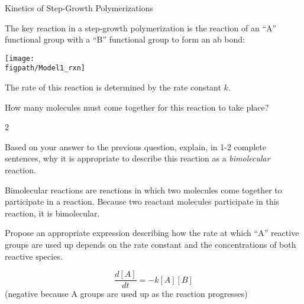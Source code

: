 \begin{activity}{Kinetics of Step-Growth Polymerizations}
\begin{instructornotes}
\end{instructornotes}


\begin{model}
\label{\labelbase:mdl:simple}

	The key reaction in a step-growth polymerization is the reaction of an ``A'' functional group with a ``B'' functional group to form an ab bond:
	
	\centerline{\texttt{[image: \\figpath/Model1\_rxn]}}
	
	The rate of this reaction is determined by the rate constant $k$.

\end{model}


\begin{ctqs}

	\question How many molecules must come together for this reaction to take place?
	
		\begin{solution}[0.5in]
			2
		\end{solution}
	
	\question Based on your answer to the previous question, explain, in 1-2 complete sentences, why it is appropriate to describe this reaction as a \emph{bimolecular} reaction.
	
		\begin{solution}[1in]
			Bimolecular reactions are reactions in which two molecules come together to participate in a reaction.  Because two reactant molecules participate in this reaction, it is bimolecular.
		\end{solution}
	
	\question Propose an appropriate expression describing how the rate at which ``A'' reactive groups are used up depends on the rate constant and the concentrations of both reactive species.
		\label{\labelbase:ctq:proposeratelaw}
		
		\begin{solution}[1in]
			\begin{equation*}
				\frac{d[A]}{dt} = -k[A][B]
			\end{equation*}
			(negative because A groups are used up as the reaction progresses)
		\end{solution}
		
\end{ctqs}


\end{activity}
